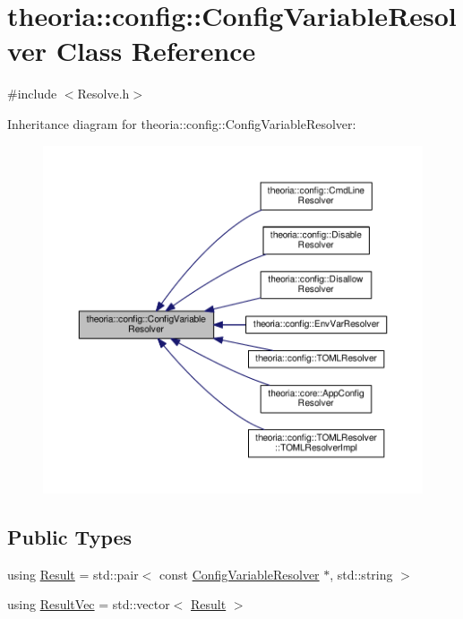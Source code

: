 \hypertarget{classtheoria_1_1config_1_1ConfigVariableResolver}{}\section{theoria\+:\+:config\+:\+:Config\+Variable\+Resolver Class Reference}
\label{classtheoria_1_1config_1_1ConfigVariableResolver}


{\ttfamily \#include $<$Resolve.\+h$>$}



Inheritance diagram for theoria\+:\+:config\+:\+:Config\+Variable\+Resolver\+:\nopagebreak
\begin{figure}[H]
\begin{center}
\leavevmode
\includegraphics[width=350pt]{classtheoria_1_1config_1_1ConfigVariableResolver__inherit__graph}
\end{center}
\end{figure}
\subsection*{Public Types}
\begin{DoxyCompactItemize}
\item 
using \hyperlink{classtheoria_1_1config_1_1ConfigVariableResolver_af27a85262d802c9ad4ecb1179efaf447}{Result} = std\+::pair$<$ const \hyperlink{classtheoria_1_1config_1_1ConfigVariableResolver}{Config\+Variable\+Resolver} $\ast$, std\+::string $>$
\item 
using \hyperlink{classtheoria_1_1config_1_1ConfigVariableResolver_a2d92a11d55181183ce4071566437f01b}{Result\+Vec} = std\+::vector$<$ \hyperlink{classtheoria_1_1config_1_1ConfigVariableResolver_af27a85262d802c9ad4ecb1179efaf447}{Result} $>$
\end{DoxyCompactItemize}
